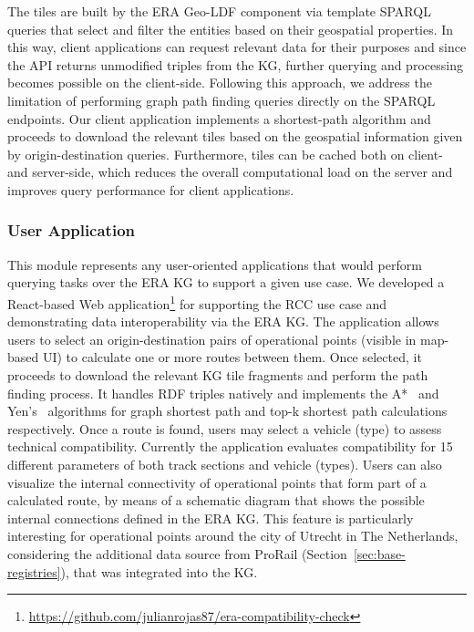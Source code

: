 The tiles are built by the ERA Geo-LDF component via
template SPARQL queries that select and filter the entities
based on their geospatial properties.
In this way, client applications can request relevant data
for their purposes and since the API returns unmodified triples from the KG,
further querying and processing becomes possible on the client-side.
Following this approach, we address the limitation
of performing graph path finding queries directly on the SPARQL endpoints.
Our client application implements a shortest-path algorithm
and proceeds to download the relevant tiles based on
the geospatial information given by origin-destination queries.
Furthermore, tiles can be cached both on client- and server-side,
which reduces the overall computational load on the server
and improves query performance for client applications.

\subsubsection{User Application}
This module represents any user-oriented applications
that would perform querying tasks over the ERA KG to support a given use case.
We developed a React-based Web 
application\footnote{\url{https://github.com/julianrojas87/era-compatibility-check}} for supporting the RCC use case
and demonstrating data interoperability via the ERA KG.
The application allows users to select
an origin-destination pairs of operational points (visible in map-based UI)
to calculate one or more routes between them.
Once selected, it proceeds to download the relevant KG tile fragments
and perform the path finding process.
It handles RDF triples natively and implements the A*~\cite{hart1968} and Yen's~\cite{yen1971} algorithms
for graph shortest path and top-k shortest path calculations respectively.
Once a route is found, users may select a vehicle (type) 
to assess technical compatibility.
Currently the application evaluates compatibility
for 15 different parameters of both track sections and vehicle (types).
Users can also visualize the internal connectivity
of operational points that form part of a calculated route,
by means of a schematic diagram
that shows the possible internal connections defined in the ERA KG.
This feature is particularly interesting for operational points
around the city of Utrecht in The Netherlands,
considering the additional data source from ProRail (Section~\ref{sec:base-registries}),
that was integrated into the KG.

